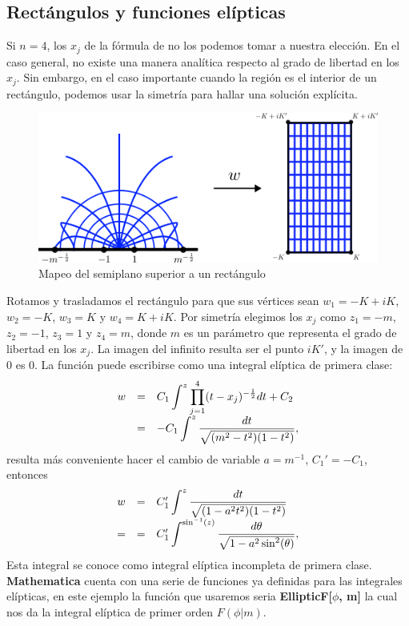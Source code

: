 \subsection{Rectángulos y funciones elípticas}
Si $n = 4$, los $x_j$ de la fórmula de \SC\; no los podemos tomar a nuestra elección. En el caso general, no existe una manera analítica respecto al grado de libertad en los $x_j$. Sin embargo, en el caso importante cuando la región es el interior de un rectángulo, podemos usar la  simetría para hallar una solución explícita.
\begin{figure}[h!]
	\centering
	\includegraphics[width=0.72\linewidth]{img/SCR}
	\caption{Mapeo del semiplano superior a un rectángulo}
	\label{fig:scr}
\end{figure}
Rotamos y trasladamos el rectángulo para que sus vértices sean $w_1=-K+iK$, $w_2=-K$, $w_3=K$ y $w_4=K+iK$. Por simetría elegimos los $x_j$ como $z_1 = -m$, 
$z_2 = -1$, $z_3 = 1$ y $z_4 = m$,  donde $m$ es un parámetro que representa el grado de libertad en los $x_j$. La imagen del infinito resulta ser  el punto $iK'$, y la imagen de $0$ es $0$. La función puede escribirse como una integral elíptica de primera clase:
\[
\begin{array}{ccl}
	w&=&C_1\displaystyle\int_{}^{z}\prod_{j=1}^{4}(t-x_j)^{-\frac{1}{2}}dt+C_2\\
	&=&-C_1\displaystyle\int_{}^{z}\dfrac{dt}{\sqrt{(m^{2}-t^2)(1-t^2)}},
\end{array}
\]
resulta más conveniente hacer el cambio de variable $a=m^{-1}$, $C_1'=-C_1$, entonces 
\[
\begin{array}{ccl}
	w&=&C_1'\displaystyle\int_{}^{z}\dfrac{dt}{\sqrt{(1-a^2t^2)(1-t^2)}}\\
	=&=&C_1'\displaystyle\int_{}^{\sin^{-1}(z)}\dfrac{d\theta}{\sqrt{1-a^2\sin^2(\theta)}},
\end{array}
\]
Esta integral se conoce como integral elíptica incompleta de primera clase. \textbf{Mathematica} cuenta con una serie de funciones ya definidas para las integrales elípticas, en este ejemplo la función que usaremos seria \textbf{EllipticF[$\phi$, m]} la cual nos da la integral elíptica de primer orden $F(\phi|m)$.\\
